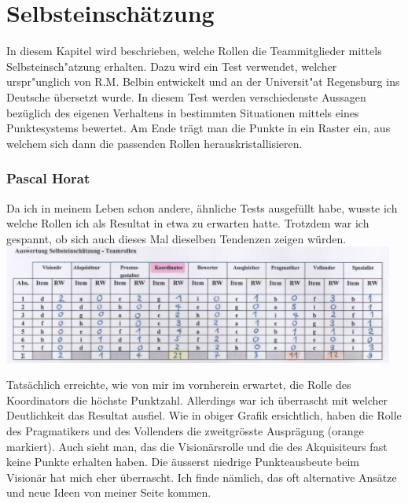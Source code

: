 
\chapter{Selbsteinschätzung}
In diesem Kapitel wird beschrieben, welche Rollen die Teammitglieder mittels Selbsteinsch"atzung erhalten. Dazu wird ein Test verwendet, welcher urspr"unglich von R.M. Belbin \cite{belbin1981management} entwickelt und an der Universit"at Regensburg ins Deutsche übersetzt wurde. In diesem Test werden verschiedenste Aussagen bezüglich des eigenen Verhaltens in bestimmten Situationen mittels eines Punktesystems bewertet. Am Ende trägt man die Punkte in ein Raster ein, aus welchem sich dann die passenden Rollen herauskristallisieren.

\subsection*{Pascal Horat}
Da ich in meinem Leben schon andere, ähnliche Tests ausgefüllt habe, wusste ich welche Rollen ich als Resultat in etwa zu erwarten hatte. Trotzdem war ich gespannt, ob sich auch dieses Mal dieselben Tendenzen zeigen würden. \\

\includegraphics[height=39mm]{images/SelbsteinschaetzungHorat.png}

Tatsächlich erreichte, wie von mir im vornherein erwartet, die Rolle des Koordinators die höchste Punktzahl. Allerdings war ich überrascht mit welcher Deutlichkeit das Resultat ausfiel. Wie in obiger Grafik ersichtlich, haben die Rolle des Pragmatikers und des Vollenders die zweitgrösste Ausprägung (orange markiert). Auch sieht man, das die Visionärsrolle und die des Akquisiteurs fast keine Punkte erhalten haben. Die äusserst niedrige Punkteausbeute beim Visionär hat mich eher überrascht. Ich finde nämlich, das oft alternative Ansätze und neue Ideen von meiner Seite kommen.

